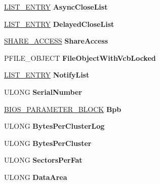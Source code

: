 \begin{DoxyCompactItemize}
\hyperlink{struct___l_i_s_t___e_n_t_r_y}{L\+I\+S\+T\+\_\+\+E\+N\+T\+RY} {\bfseries Async\+Close\+List}
\item 
\mbox{\label{struct___v_c_b_af6e14d9dab3a3fde813d397e0dc5ec3e}} 
\hyperlink{struct___l_i_s_t___e_n_t_r_y}{L\+I\+S\+T\+\_\+\+E\+N\+T\+RY} {\bfseries Delayed\+Close\+List}
\item 
\mbox{\label{struct___v_c_b_a26b5a8d29a106b2e4439b76c5fe7edaf}} 
\hyperlink{struct___s_h_a_r_e___a_c_c_e_s_s}{S\+H\+A\+R\+E\+\_\+\+A\+C\+C\+E\+SS} {\bfseries Share\+Access}
\item 
\mbox{\label{struct___v_c_b_a048a191fceaefbf5e910fe223cba6d5c}} 
P\+F\+I\+L\+E\+\_\+\+O\+B\+J\+E\+CT {\bfseries File\+Object\+With\+Vcb\+Locked}
\item 
\mbox{\label{struct___v_c_b_aab76dda631f0486178169ebdf7363a00}} 
\hyperlink{struct___l_i_s_t___e_n_t_r_y}{L\+I\+S\+T\+\_\+\+E\+N\+T\+RY} {\bfseries Notify\+List}
\item 
\mbox{\label{struct___v_c_b_a0aaec1d0e57f5f9f23e4aa151660c993}} 
U\+L\+O\+NG {\bfseries Serial\+Number}
\item 
\mbox{\label{struct___v_c_b_ad4e0435766f28beea2cf9083954705a9}} 
\hyperlink{struct_b_i_o_s___p_a_r_a_m_e_t_e_r___b_l_o_c_k}{B\+I\+O\+S\+\_\+\+P\+A\+R\+A\+M\+E\+T\+E\+R\+\_\+\+B\+L\+O\+CK} {\bfseries Bpb}
\item 
\mbox{\label{struct___v_c_b_a45c92db80a2ca214ba895941feb60d25}} 
U\+L\+O\+NG {\bfseries Bytes\+Per\+Cluster\+Log}
\item 
\mbox{\label{struct___v_c_b_ab723b4f0d9064191fb05a3d9f68d9d01}} 
U\+L\+O\+NG {\bfseries Bytes\+Per\+Cluster}
\item 
\mbox{\label{struct___v_c_b_ae449ee06368705f80c2db846ef1640ba}} 
U\+L\+O\+NG {\bfseries Sectors\+Per\+Fat}
\item 
\mbox{\label{struct___v_c_b_a5efe82d1976f0fe01b7009c15050dcae}} 
U\+L\+O\+NG {\bfseries Data\+Area}
\item 

\end{DoxyCompactItemize}
